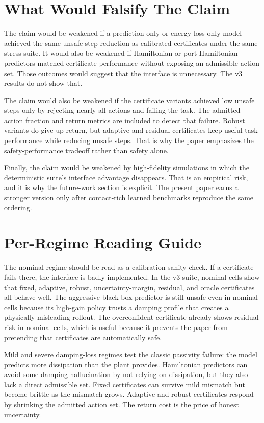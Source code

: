 \documentclass{article}
\begin{document}
\section{What Would Falsify The Claim}

The claim would be weakened if a prediction-only or energy-loss-only model achieved the same unsafe-step reduction as calibrated certificates under the same stress suite. It would also be weakened if Hamiltonian or port-Hamiltonian predictors matched certificate performance without exposing an admissible action set. Those outcomes would suggest that the interface is unnecessary. The v3 results do not show that.

The claim would also be weakened if the certificate variants achieved low unsafe steps only by rejecting nearly all actions and failing the task. The admitted action fraction and return metrics are included to detect that failure. Robust variants do give up return, but adaptive and residual certificates keep useful task performance while reducing unsafe steps. That is why the paper emphasizes the safety-performance tradeoff rather than safety alone.

Finally, the claim would be weakened by high-fidelity simulations in which the deterministic suite's interface advantage disappears. That is an empirical risk, and it is why the future-work section is explicit. The present paper earns a stronger version only after contact-rich learned benchmarks reproduce the same ordering.

\clearpage
\section{Per-Regime Reading Guide}

The nominal regime should be read as a calibration sanity check. If a certificate fails there, the interface is badly implemented. In the v3 suite, nominal cells show that fixed, adaptive, robust, uncertainty-margin, residual, and oracle certificates all behave well. The aggressive black-box predictor is still unsafe even in nominal cells because its high-gain policy trusts a damping profile that creates a physically misleading rollout. The overconfident certificate already shows residual risk in nominal cells, which is useful because it prevents the paper from pretending that certificates are automatically safe.

Mild and severe damping-loss regimes test the classic passivity failure: the model predicts more dissipation than the plant provides. Hamiltonian predictors can avoid some damping hallucination by not relying on dissipation, but they also lack a direct admissible set. Fixed certificates can survive mild mismatch but become brittle as the mismatch grows. Adaptive and robust certificates respond by shrinking the admitted action set. The return cost is the price of honest uncertainty.
\end{document}
